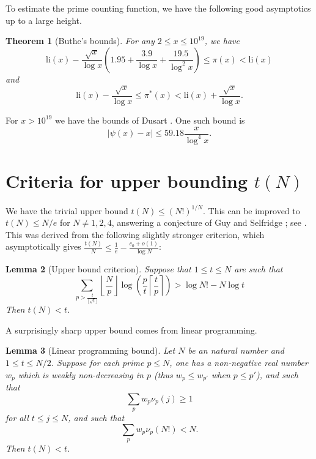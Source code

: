 \documentclass[12pt,a4paper,reqno]{amsart}
\numberwithin{equation}{section}
\theoremstyle{plain}
\newtheorem{theorem}{Theorem}[section]
\newtheorem{lemma}[theorem]{Lemma}
\theoremstyle{definition}
\begin{document}
To estimate the prime counting function, we have the following good asymptotics up to a large height.

  \begin{theorem}[Buthe's bounds]\cite{buthe}  For any $2 \leq x \leq 10^{19}$, we have
  $$ \mathrm{li}(x) - \frac{\sqrt{x}}{\log x}\left(1.95 + \frac{3.9}{\log x} + \frac{19.5}{\log^2 x}\right) \leq \pi(x) < \mathrm{li}(x)$$
  and
  $$ \mathrm{li}(x) - \frac{\sqrt{x}}{\log x} \leq \pi^*(x) < \mathrm{li}(x) + \frac{\sqrt{x}}{{\log x}}.$$
  \end{theorem}
  
  For $x > 10^{19}$ we have the bounds of Dusart \cite{dusart}.  One such bound is
  $$ |\psi(x) - x| \leq 59.18 \frac{x}{\log^4 x}.$$

  
\section{Criteria for upper bounding \texorpdfstring{$t(N)$}{t(N)}}

We have the trivial upper bound $t(N) \leq (N!)^{1/N}$.  This can be improved to $t(N) \leq N/e$ for $N \neq 1,2,4$, answering a conjecture of Guy and Selfridge \cite{guy-selfridge}; see \cite{tao}.  This was derived from the following slightly stronger criterion, which asymptotically gives $\frac{t(N)}{N} \leq \frac{1}{e} - \frac{c_0+o(1)}{\log N}$:

\begin{lemma}[Upper bound criterion]\label{upper-crit}  \cite[Lemma 2.1]{tao} Suppose that $1 \leq t \leq N$ are such that
  \begin{equation}\label{contra}
     \sum_{p > \frac{t}{\lfloor\sqrt{t}\rfloor}} \left\lfloor \frac{N}{p} \right\rfloor \log \left( \frac{p}{t} \left\lceil \frac{t}{p} \right\rceil \right) > \log N! - N \log t
  \end{equation}
  Then $t(N) < t$.
  \end{lemma}

A surprisingly sharp upper bound comes from linear programming.

\begin{lemma}[Linear programming bound]\label{lp-upper}  Let $N$ be an natural number and $1 \leq t \leq N/2$.  Suppose for each prime $p \leq N$, one has a non-negative real number $w_p$ which is weakly non-decreasing in $p$ (thus $w_p \leq w_{p'}$ when $p \leq p'$), and such that
\begin{equation}\label{pj}
 \sum_p w_p \nu_p(j) \geq 1
\end{equation}
for all $t \leq j \leq N$, and such that
\begin{equation}\label{hyp}
\sum_p w_p \nu_p(N!) < N.
\end{equation}
Then $t(N) < t$.
\end{lemma}
\end{document}
